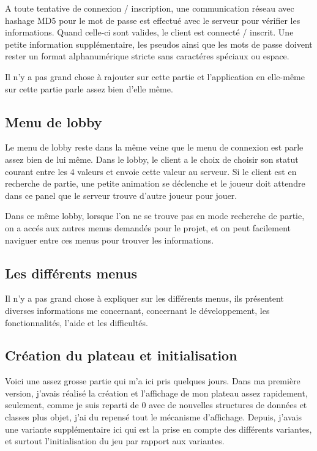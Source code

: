 \documentclass[12pt, openany]{report}
\begin{document}
A toute tentative de connexion / inscription, une communication réseau avec hashage MD5 pour le mot de passe est effectué avec le serveur pour vérifier les informations. Quand celle-ci sont valides, le client est connecté / inscrit. Une petite information supplémentaire, les pseudos ainsi que les mots de passe doivent rester un format alphanumérique stricte sans caractéres spéciaux ou espace.

Il n'y a pas grand chose à rajouter sur cette partie et l'application en elle-même sur cette partie parle assez bien d'elle même.
	
	\subsection{Menu de lobby}
	Le menu de lobby reste dans la même veine que le menu de connexion est parle assez bien de lui même. Dans le lobby, le client a le choix de choisir son statut courant entre les 4 valeurs et envoie cette valeur au serveur. Si le client est en recherche de partie, une petite animation se déclenche et le joueur doit attendre dans ce panel que le serveur trouve d'autre joueur pour jouer.

Dans ce même lobby, lorsque l'on ne se trouve pas en mode recherche de partie, on a accés aux autres menus demandés pour le projet, et on peut facilement naviguer entre ces menus pour trouver les informations.

	\subsection{Les différents menus}
	Il n'y a pas grand chose à expliquer sur les différents menus, ils présentent diverses informations me concernant, concernant le développement, les fonctionnalités, l'aide et les difficultés.

	\subsection{Création du plateau et initialisation}
	Voici une assez grosse partie qui m'a ici pris quelques jours. Dans ma première version, j'avais réalisé la création et l'affichage de mon plateau assez rapidement, seulement, comme je suis reparti de 0 avec de nouvelles structures de données et classes plus objet, j'ai du repensé tout le mécanisme d'affichage. Depuis, j'avais une variante supplémentaire ici qui est la prise en compte des différents variantes, et surtout l'initialisation du jeu par rapport aux variantes.
\end{document}
